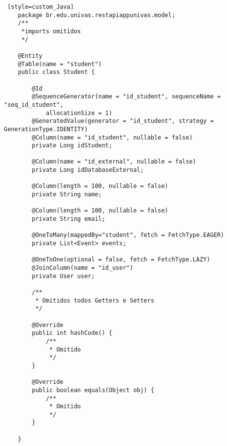 \begin{lstlisting} [style=custom_Java]	
	package br.edu.univas.restapiappunivas.model;
	/**
	 *imports omitidos
	 */
	
	@Entity
	@Table(name = "student")
	public class Student {
	
		@Id
		@SequenceGenerator(name = "id_student", sequenceName = "seq_id_student",
			allocationSize = 1) 
		@GeneratedValue(generator = "id_student", strategy = GenerationType.IDENTITY)
		@Column(name = "id_student", nullable = false)
		private Long idStudent;
	
		@Column(name = "id_external", nullable = false)
		private Long idDatabaseExternal;
	
		@Column(length = 100, nullable = false)
		private String name;
	
		@Column(length = 100, nullable = false)
		private String email;
	
		@OneToMany(mappedBy="student", fetch = FetchType.EAGER)
		private List<Event> events;
	
		@OneToOne(optional = false, fetch = FetchType.LAZY)
		@JoinColumn(name = "id_user")
		private User user;
	
		/**
		 * Omitidos todos Getters e Setters
		 */
	
		@Override
		public int hashCode() {
			/**
			 * Omitido
			 */
		}
	
		@Override
		public boolean equals(Object obj) {
			/**
			 * Omitido
			 */
		}
	
	}
\end{lstlisting}